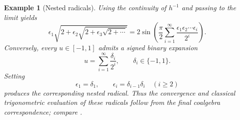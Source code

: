 \documentclass{sn-jnl}%
\theoremstyle{thmstyleone}%
\theoremstyle{thmstyletwo}%
\newtheorem{example}{Example}%
\theoremstyle{thmstylethree}%
\begin{document}
\begin{example}[Nested radicals]
    Using the continuity of $h^{-1}$ and passing to the limit yields
    \begin{equation} 
    \nonumber
       \epsilon_1\sqrt{ 2+\epsilon_2\sqrt{ 2+\epsilon_3\sqrt{2+\cdots} } } =        2\sin\left( \frac{\pi}{2} \sum_{i=1}^{\infty} \frac{\epsilon_1\epsilon_2\cdots\epsilon_i}{2^i} \right).
    \end{equation}
    Conversely, every $u\in[-1,1]$ admits a signed binary expansion
    \begin{equation} 
    \nonumber
       u=\sum_{i=1}^{\infty}\frac{\delta_i}{2^i}, \qquad \delta_i\in\{-1,1\}.
    \end{equation}
    Setting
    \begin{equation} 
    \nonumber
       \epsilon_1=\delta_1, \qquad \epsilon_i=\delta_{i-1}\delta_i \quad (i\geq2)
    \end{equation}
    produces the corresponding nested radical. Thus the convergence and classical trigonometric evaluation of these radicals follow from the final coalgebra correspondence; compare \cite{nested}.
\end{example}
  
\end{document}
